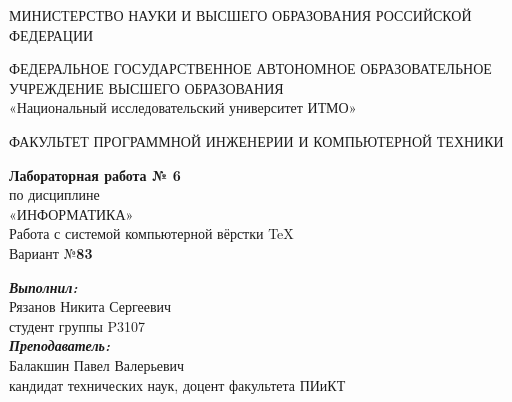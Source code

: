 
% 
    \thispagestyle{fancy} %
    \fancyhead{} %
    \fancyfoot{} %
    
    \begin{center}
        МИНИСТЕРСТВО НАУКИ И ВЫСШЕГО ОБРАЗОВАНИЯ РОССИЙСКОЙ ФЕДЕРАЦИИ

        \vspace{2em}

        ФЕДЕРАЛЬНОЕ ГОСУДАРСТВЕННОЕ АВТОНОМНОЕ ОБРАЗОВАТЕЛЬНОЕ УЧРЕЖДЕНИЕ ВЫСШЕГО ОБРАЗОВАНИЯ\\
        \large{«Национальный исследовательский университет ИТМО»}

        \vspace{2em}
        \Large{ФАКУЛЬТЕТ ПРОГРАММНОЙ ИНЖЕНЕРИИ И КОМПЬЮТЕРНОЙ ТЕХНИКИ}

        \vfill
        
        \textbf{\Large{Лабораторная работа № 6}}\\
        \vspace{1em}
        \Large{по дисциплине\\\vspace{1em}«ИНФОРМАТИКА»}\\
        \vspace{1em}
        \Large{Работа с системой компьютерной вёрстки \TeX}\\
        \vspace{1em}
        Вариант №\textbf{83}

        \vfill
    \end{center}

    \begin{flushright}
        \vfill
        \large{
            \textbf{\textit{Выполнил:}}\\
            Рязанов Никита Сергеевич\\
            студент группы P3107\\
            \vspace{1em}
            \textbf{\textit{Преподаватель:}}\\
            Балакшин Павел Валерьевич\\
            кандидат технических наук, доцент факультета ПИиКТ
        }
        \vfill
    \end{flushright}
    \clearpage
% 